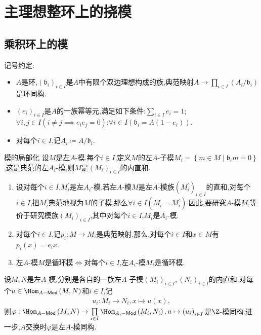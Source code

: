 \chapter{主理想整环上的挠模}

\section{乘积环上的模}

记号约定:
\begin{itemize}
	\item $A$是环,$\left(\mathfrak{b}_{i}\right)_{i\in I}$是$A$中有限个双边理想构成的族,典范映射$A\to\prod\limits_{i\in I}\left(A_{i}/\mathfrak{b}_{i}\right)$是环同构.
	\item $\left(e_{i}\right)_{i\in I}$是$A$的一族幂等元,满足如下条件:$\sum\limits_{i\in I}e_{i}=1$;$\forall i,j\in I\left(i\neq j\implies e_{i}e_{j}=0\right)$;$\forall i\in I\left(\mathfrak{b}_{i}=A\left(1-e_{i}\right)\right)$.
	\item 对每个$i\in I$,记$A_{i}\coloneq A/\mathfrak{b}_{i}$.
\end{itemize}

\begin{proposition}{模的局部化}{}
	设$M$是左$A$-模.每个$i\in I$,定义$M$的左$A$-子模$M_{i}=\left\{m\in M\middle|\mathfrak{b}_{i}m=0\right\}$,这是典范的左$A_{i}$-模,则$M$是$\left(M_{i}\right)_{i\in I}$的内直和.
\end{proposition}

\begin{remark}{}{}
	\begin{enumerate}
		\item 设对每个$i\in I$,$M_{i}^{\prime}$是左$A_{i}$-模.若左$A$-模$M$是左$A$-模族$\left(M_{i}^{\prime}\right)_{i\in I}$的直和,对每个$i\in I$,把$M_{i}^{\prime}$典范地视为$M$的子模,那么$\forall i\in I\left(M_{i}=M_{i}^{\prime}\right)$.因此,要研究$A$-模$M$,等价于研究模族$\left(M_{i}\right)_{i\in I}$,其中对每个$i\in I$,$M_{i}$是$A_{i}$-模.
		\item 对每个$i\in I$,记$p_{i}:M\to M_{i}$是典范映射.那么,对每个$i\in I$和$x\in M$有$p_{i}\left(x\right)=e_{i}x$.
		\item 左$A$-模$M$是循环模$\iff$对每个$i\in I$,左$A_{i}$-模$M_{i}$是循环模.
	\end{enumerate}
\end{remark}

\begin{remark}{}{}
	设$M,N$是左$A$-模,分别是各自的一族左$A$-子模$\left(M_{i}\right)_{i\in I},\left(N_{i}\right)_{i\in I}$的内直和.对每个$u\in\Hom_{{A}-\mathsf{Mod}}\left(M,N\right)$和$i\in I$,记
	\begin{align*}
		u_{i}:M_{i}\to N_{i},x\mapsto u\left(x\right),
	\end{align*}
	则$\varphi:\Hom_{{A}-\mathsf{Mod}}\left(M,N\right)\to\prod\limits_{i\in I}\Hom_{{A}_{i}-\mathsf{Mod}}\left(M_{i},N_{i}\right),u\mapsto\left(u_{i}\right)_{i\in I}$是$\Z$-模同构.进一步,$A$交换时$\varphi$是左$A$-模同构.
\end{remark}
